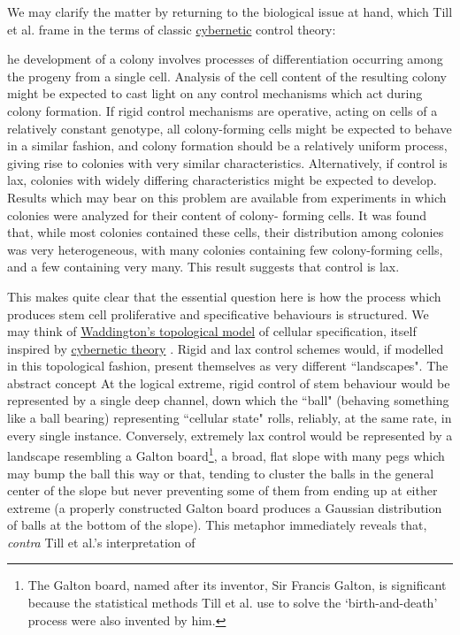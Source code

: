 We may clarify the matter by returning to the biological issue at hand, which Till et al. frame in the terms of classic \hyperref[cybernetics]{cybernetic} \label{TMSmodel2} control theory:

\begin{longquote}
[T]he development of a colony involves processes of differentiation occurring among the progeny from a single cell. Analysis of the cell
content of the resulting colony might be expected to cast light on any control
mechanisms which act during colony formation. If rigid control mechanisms are
operative, acting on cells of a relatively constant genotype, all colony-forming cells
might be expected to behave in a similar fashion, and colony formation should be
a relatively uniform process, giving rise to colonies with very similar characteristics.
Alternatively, if control is lax, colonies with widely differing characteristics might
be expected to develop. Results which may bear on this problem are available
from experiments in which colonies were analyzed for their content of colony-
forming cells. It was found that, while most colonies contained these cells,
their distribution among colonies was very heterogeneous, with many colonies
containing few colony-forming cells, and a few containing very many. This result
suggests that control is lax.
\cite{Till1964}
\end{longquote}

This makes quite clear that the essential question here is how the process which produces stem cell proliferative and specificative behaviours is structured. We may think of \hyperref[Waddington]{Waddington's topological model} of cellular specification, itself inspired by \hyperref[cybernetics]{cybernetic theory} \label{TMSmodel3}. Rigid and lax control schemes would, if modelled in this topological fashion, present themselves as very different ``landscapes". The abstract concept At the logical extreme, rigid control of stem behaviour would be represented by a single deep channel, down which the ``ball" (behaving something like a ball bearing) representing ``cellular state" rolls, reliably, at the same rate, in every single instance. Conversely, extremely lax control would be represented by a landscape resembling a Galton board\footnote{The Galton board, named after its inventor, Sir Francis Galton, is significant because the statistical methods Till et al. use to solve the `birth-and-death' process were also invented by him.}, a broad, flat slope with many pegs which may bump the ball this way or that, tending to cluster the balls in the general center of the slope but never preventing some of them from ending up at either extreme (a properly constructed Galton board produces a Gaussian distribution of balls at the bottom of the slope). This metaphor immediately reveals that, \textit{contra} Till et al.'s interpretation of 
